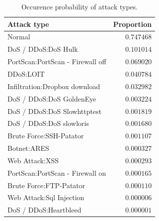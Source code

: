 \documentclass[conference]{IEEEtran}
\begin{document}
\begin{table}[b]
\caption{Occurence probability of attack types.} \label{tab:occurrence}
\centering
\begin{tabular}{l r} \toprule
Attack type & Proportion \\
\midrule
Normal                                                         & $0.747468$ \\
DoS / DDoS:DoS Hulk                                            & $0.101014$ \\
PortScan:PortScan - Firewall off                               & $0.069020$ \\
DDoS:LOIT                                                      & $0.040784$ \\
Infiltration:Dropbox download                                  & $0.032982$ \\
DoS / DDoS:DoS GoldenEye                                       & $0.003224$ \\
DoS / DDoS:DoS Slowhttptest                                    & $0.001819$ \\
DoS / DDoS:DoS slowloris                                       & $0.001680$ \\
Brute Force:SSH-Patator                                        & $0.001107$ \\
Botnet:ARES                                                    & $0.000327$ \\
Web Attack:XSS                                                 & $0.000293$ \\
PortScan:PortScan - Firewall on                                & $0.000165$ \\
Brute Force:FTP-Patator                                        & $0.000110$ \\
Web Attack:Sql Injection                                       & $0.000006$ \\
DoS / DDoS:Heartbleed                                          & $0.000001$ \\
\bottomrule
\end{tabular}
\label{tab:occurence}
\end{table}
\end{document}

